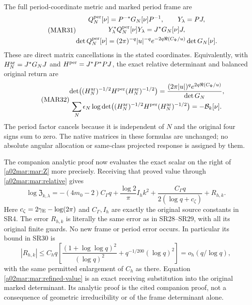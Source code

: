The full period-coordinate metric and marked period frame are
\begin{equation}\tag{MAR31}\label{a02mar:mar:periodmetric}
 \begin{gathered}
 Q_N^{\rm per}[\nu]=P^{-*}G_N[\nu]P^{-1},\qquad Y_\lambda=PJ,\\
 Y_\lambda^*Q_N^{\rm per}[\nu]Y_\lambda=J^*G_N[\nu]J,\\
 \det Q_N^{\rm per}[\nu]
  =(2\pi)^{-q}|u|^{-q}e^{-2q\Re(C_\Phi/u)}\det G_N[\nu].
 \end{gathered}
\end{equation}
These are direct matrix cancellations in the stated coordinates.
Equivalently, with $H_N^{\rm ar}=J^*G_NJ$ and
$H^{\rm per}=J^*P^*PJ$, the exact relative determinant and
balanced original return are
\begin{equation}\tag{MAR32}\label{a02mar:mar:periodreturn}
 \begin{gathered}
 \det\bigl((H_N^{\rm ar})^{-1/2}H^{\rm per}(H_N^{\rm ar})^{-1/2}\bigr)
 =\frac{(2\pi|u|)^q e^{2q\Re(C_\Phi/u)}}{\det G_N},\\
 \sum_N\epsilon_N\log\det\bigl((H_N^{\rm ar})^{-1/2}
                 H^{\rm per}(H_N^{\rm ar})^{-1/2}\bigr)
              =-\mathcal B_k[\nu].
 \end{gathered}
\end{equation}
The period factor cancels because it is independent of $N$ and
the original four signs sum to zero. The native matrices in
these formulas are unchanged; no absolute angular allocation or
same-class projected response is assigned by them.

The companion analytic proof \cite[SR28--SR30]{a02mar:signed} now evaluates
the exact scalar on the right of \eqref{a02mar:mar:Z} more precisely.
Receiving that proved value through \eqref{a02mar:mar:relative} gives
\begin{equation}\tag{MAR33}\label{a02mar:mar:refined-value}
 \log\mathfrak Z_{k,\lambda}
 =-(4m_0-2)C_\Gamma q+\frac{\log2}{\pi}I_hk^2
       +\frac{C_\Gamma q}{2(\log q+c_\zeta)}+R_{h,k}.
\end{equation}
Here $c_\zeta=2\gamma_{\rm E}-\log(2\pi)$ and $C_\Gamma,I_h$
are exactly the original source constants in SR4. The error
$R_{h,k}$ is literally the same error as in SR28--SR29, with all
its original finite guards. No new frame or period error occurs.
In particular its bound in SR30 is
\[
 |R_{h,k}|\le C_h q\left[
 \frac{(1+\log\log q)^2}{(\log q)^2}
             +q^{-1/200}(\log q)^2\right]=o_h(q/\log q),
\]
with the same permitted enlargement of $C_h$ as there.
Equation \eqref{a02mar:mar:refined-value} is an exact receiving
substitution into the original marked determinant. Its analytic
proof is the cited companion proof, not a consequence of
geometric irreducibility or of the frame determinant alone.

